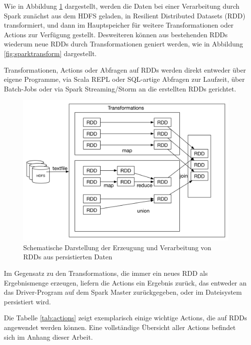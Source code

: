 Wie in Abbildung \ref{fig:rddunkt} dargestellt, werden die Daten bei einer Verarbeitung durch Spark zunächst aus dem HDFS geladen, in Resilient Distributed Datasets (RDD) transformiert, und dann im Hauptspeicher für weitere Transformationen oder Actions zur Verfügung gestellt. Desweiteren können aus bestehenden RDDs wiederum neue RDDs durch Transformationen geniert werden, wie in Abbildung \ref{fig:sparktransform} dargestellt. 

Transformationen, Actions oder Abfragen auf RDDs werden direkt entweder über eigene Programme, via Scala REPL oder SQL-artige Abfragen zur Laufzeit, über Batch-Jobs oder via Spark Streaming/Storm an die erstellten RDDs gerichtet.

\begin{figure}[htb!]
\centering
\includegraphics[width=1.0\textwidth]{bilder/rdd_transform.png}
\caption{Schematische Darstellung der Erzeugung und Verarbeitung von RDDs aus persistierten Daten}
\label{fig:rddunkt}
\end{figure}

Im Gegensatz zu den Transformations, die immer ein neues RDD als Ergebnismenge erzeugen, liefern die Actions ein Ergebnis zurück, das entweder an das Driver-Program auf dem Spark Master zurückgegeben, oder im Dateisystem persistiert wird. 

Die Tabelle \ref{tab:actions} zeigt exemplarisch einige wichtige Actions, die auf RDDs angewendet werden können. Eine vollständige Übersicht aller Actions befindet sich im Anhang dieser Arbeit. 


